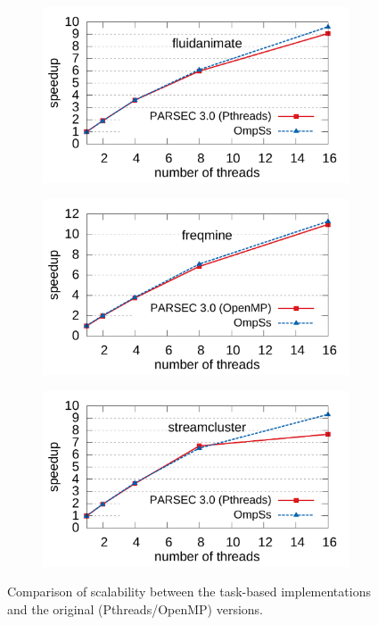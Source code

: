 \begin{figure}[p]
				\centering
				\begin{subfigure}[b]{0.8\textwidth}
                \includegraphics[width=\textwidth]{task_benchmarks/figures/fluidanimate_scale}
                \label{fig:fluidanimate_scale}
        \end{subfigure}
\hfill
        \begin{subfigure}[b]{0.8\textwidth}
                \includegraphics[width=\textwidth]{task_benchmarks/figures/freqmine_scale}
                \label{fig:freqmine_scale}
        \end{subfigure}
\hfill        
				\begin{subfigure}[b]{0.8\textwidth}
                \includegraphics[width=\textwidth]{task_benchmarks/figures/streamcluster_scale}
                \label{fig:streamcluster_scale}
        \end{subfigure}
			\caption{Comparison of scalability between the task-based implementations and the original (Pthreads/OpenMP) versions.}
			\label{fig:scalability_graphs_3}
\end{figure}

